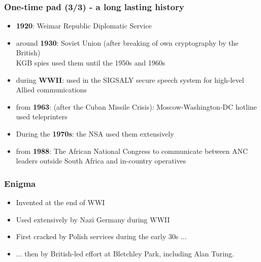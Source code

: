 \documentclass[
hyperref={pdfpagelabels=false}
,xcolor=table
]
{beamer}
\begin{document}
\begin{frame}
  \frametitle{One-time pad (3/3) - a long lasting history}
  \begin{itemize}
  \item \textbf{1920}: Weimar Republic Diplomatic Service
  \item around \textbf{1930}: Soviet Union (after breaking of own cryptography by the British)\\
    KGB spies used them until the 1950s and 1960s
  \item during \textbf{WWII}: used in the SIGSALY secure speech system
    for high-level Allied communications
  \item from \textbf{1963}: (after the Cuban Missile Crisis):
    Moscow-Washington-DC hotline used teleprinters
  \item During the \textbf{1970s}: the NSA used them extensively
  \item from \textbf{1988}: The African National Congress to
    communicate between ANC leaders outside South Africa and
    in-country operatives
  \end{itemize}
\end{frame}

  


\begin{frame}
  \frametitle{Enigma}


  \vspace{-2cm}
  
  \begin{itemize}
  \item Invented at the end of WWI
  \item Used extensively by Nazi Germany during WWII
  \item First cracked by Polish services during the early 30s ... 
  \item ... then by British-led effort at Bletchley Park, including Alan Turing. 
  \end{itemize}
\end{frame}
\end{document}
